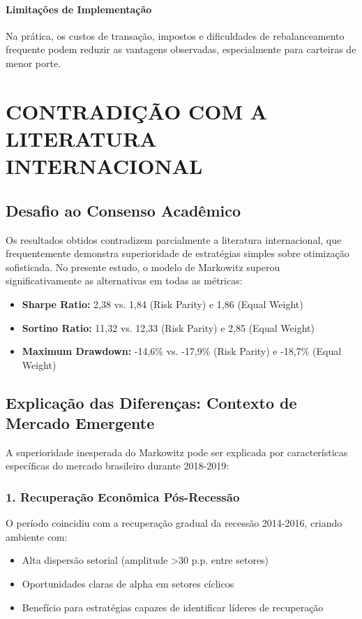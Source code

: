 \paragraph{Limitações de Implementação}
Na prática, os custos de transação, impostos e dificuldades de rebalanceamento frequente podem reduzir as vantagens observadas, especialmente para carteiras de menor porte.

\section{CONTRADIÇÃO COM A LITERATURA INTERNACIONAL}

\subsection{Desafio ao Consenso Acadêmico}

Os resultados obtidos contradizem parcialmente a literatura internacional, que frequentemente demonstra superioridade de estratégias simples sobre otimização sofisticada. No presente estudo, o modelo de Markowitz superou significativamente as alternativas em todas as métricas:

\begin{itemize}
    \item \textbf{Sharpe Ratio:} 2,38 vs. 1,84 (Risk Parity) e 1,86 (Equal Weight)
    \item \textbf{Sortino Ratio:} 11,32 vs. 12,33 (Risk Parity) e 2,85 (Equal Weight)
    \item \textbf{Maximum Drawdown:} -14,6\% vs. -17,9\% (Risk Parity) e -18,7\% (Equal Weight)
\end{itemize}

\subsection{Explicação das Diferenças: Contexto de Mercado Emergente}

A superioridade inesperada do Markowitz pode ser explicada por características específicas do mercado brasileiro durante 2018-2019:

\subsubsection{1. Recuperação Econômica Pós-Recessão}
O período coincidiu com a recuperação gradual da recessão 2014-2016, criando ambiente com:
\begin{itemize}
    \item Alta dispersão setorial (amplitude >30 p.p. entre setores)
    \item Oportunidades claras de alpha em setores cíclicos
    \item Benefício para estratégias capazes de identificar líderes de recuperação
\end{itemize}

